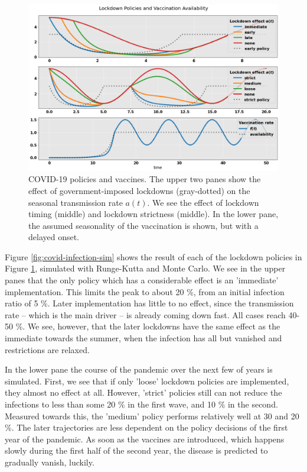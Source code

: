 \documentclass[]{article}
\begin{document}
\begin{figure}[!h]
	\centering
	\includegraphics[width=1\linewidth]{./figs/covid-policy.png}
	\caption{COVID-19 policies and vaccines. The upper two panes show the effect of government-imposed lockdowns (gray-dotted) on the seasonal transmission rate $a(t)$. We see the effect of lockdown timing (middle) and lockdown strictness (middle). In the lower pane, the assumed seasonality of the vaccination is shown, but with a delayed onset.}
	\label{fig:covid-policy}
\end{figure}

Figure \ref{fig:covid-infection-sim} shows the result of each of the lockdown policies in Figure \ref{fig:covid-policy}, simulated with Runge-Kutta and Monte Carlo. We see in the upper panes that the only policy which has a considerable effect is an 'immediate' implementation. This limits the peak to about 20 \%, from an initial infection ratio of 5 \%. Later implementation has little to no effect, since the transmission rate -- which is the main driver -- is already coming down fast. All cases reach 40-50 \%. We see, however, that the later lockdowns have the same effect as the immediate towards the summer, when the infection has all but vanished and restrictions are relaxed.

In the lower pane the course of the pandemic over the next few of years is simulated. First, we see that if only 'loose' lockdown policies are implemented, they almost no effect at all. However, 'strict' policies still can not reduce the infections to less than some 20 \% in the first wave, and 10 \% in the second. Measured towards this, the 'medium' policy performs relatively well at 30 and 20 \%. The later trajectories are less dependent on the policy decisions of the first year of the pandemic. As soon as the vaccines are introduced, which happens slowly during the first half of the second year, the disease is predicted to gradually vanish, luckily.
\end{document}
